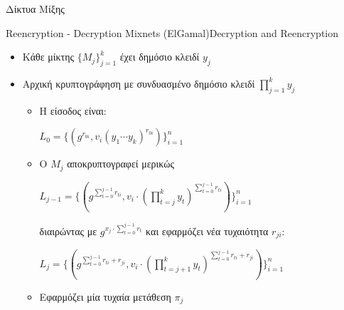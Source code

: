 \documentclass[handout]{beamer}
\begin{document}
\begin{section}{Δίκτυα Μίξης}
 \begin{frame}{Reencryption  - Decryption Mixnets (ElGamal)}{Decryption and Reencryption}
   \begin{itemize}  
        
        \item Κάθε μίκτης $\{ M_j \}_{j=1}^k$ έχει δημόσιο κλειδί $y_j$ 
        \item Αρχική κρυπτογράφηση με συνδυασμένο δημόσιο κλειδί \pause  $\prod_{j=1}^k y_j$ \pause
        
        \begin{itemize} 
        \item Η είσοδος είναι:
        \begin{center}$L_0 = \{ (g^{r_{0i}}, v_i (y_1 \cdots y_k)^{r_{0i}}) \}_{i=1}^n$ \end{center} \pause

        \item Ο $M_j$ αποκρυπτογραφεί μερικώς 
        \begin{center}
        $L_{j-1} = \{ (g^{\sum_{t=0}^{j-1} r_{ti}}, v_i \cdot (\prod_{t=j}^k y_t)^{\sum_{t=0}^{j-1} r_{ti}}) \}_{i=1}^n$ 
        \end{center}
        διαιρώντας με $g^{x_j \cdot {\sum_{t=0}^{j-1} r_t}}$ \pause και εφαρμόζει νέα τυχαιότητα $r_{ji}$: 
        \begin{center}
        $L_{j} = \{ (g^{\sum_{t=0}^{j-1} r_{ti} + r_{ji}}, v_i \cdot (\prod_{t=j+1}^k y_t)^{\sum_{t=0}^{j-1} r_{ti} + r_{ji}}) \}_{i=1}^n$
        \end{center} \pause
        \item Εφαρμόζει μία τυχαία μετάθεση $\pi_j$ 
        \end{itemize} 
    \end{itemize} 
\end{frame}


\end{section}
\end{document}
